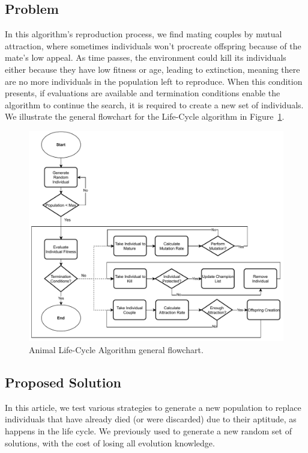 \documentclass[graybox]{svmult}
\begin{document}
    \subsection{Problem}

        In this algorithm's reproduction process, we find mating couples by mutual
        attraction, where sometimes individuals won't procreate offspring because of
        the mate's low appeal. As time passes, the environment could kill its
        individuals either because they have low fitness or age, leading to extinction,
        meaning there are no more individuals in the population left to reproduce. When
        this condition presents, if evaluations are available and termination
        conditions enable the algorithm to continue the search, it is required to
        create a new set of individuals. We illustrate the general flowchart for the
        Life-Cycle algorithm in Figure~\ref{fig.flowchart}.
        

        \begin{figure}
            \includegraphics[width=\textwidth]{img/fig_flowchart.pdf}
            \caption{Animal Life-Cycle Algorithm general flowchart.} \label{fig.flowchart}
            \end{figure}

    \subsection{Proposed Solution}
        In this article, we test various strategies to generate a new population to
        replace individuals that have already died (or were discarded) due to their
        aptitude, as happens in the life cycle. We previously used to generate a new
        random set of solutions, with the cost of losing all evolution knowledge. 
        
\end{document}
